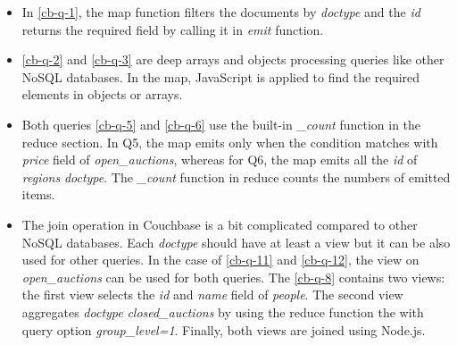  \begin{itemize}
 \item  In \ref{cb-q-1}, the map function filters the documents by \textit{doctype} and the \textit{id} returns the required field by calling it in \textit{emit} function.
 
 \item \ref{cb-q-2} and \ref{cb-q-3} are deep arrays and objects processing queries like other NoSQL databases. In the map,  JavaScript is applied  to find the required elements in objects or arrays.
 
 \item Both queries \ref{cb-q-5} and \ref{cb-q-6} use the built-in \textit{\_count} function  in the reduce section.  In Q5, the map emits only when the condition matches with \textit{price} field of \textit{open\_auctions}, whereas for Q6, the map
 emits all the \textit{id} of \textit{regions} \textit{doctype}.  The \textit{\_count} function in reduce counts the numbers of emitted items. 
 
 \item The join operation in Couchbase is a bit complicated compared to other NoSQL databases. Each \textit{doctype} should have at least a view but it can be also used for other queries. In the case of \ref{cb-q-11} and \ref{cb-q-12}, the view on \textit{open\_auctions} can be used for both queries. The \ref{cb-q-8} contains two views: the first view selects the \textit{id} and \textit{name} field of \textit{people}. The second view aggregates \textit{doctype} \textit{closed\_auctions} by using the reduce function the with query option \textit{group\_level=1}. Finally, both views are joined using Node.js. 
 

\end{itemize}
